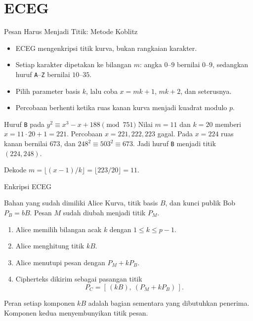 \documentclass[aspectratio=169,11pt]{beamer}
\begin{document}
\section{ECEG}

\begin{frame}{Pesan Harus Menjadi Titik: Metode Koblitz}
    \begin{itemize}
        \item ECEG mengenkripsi titik kurva, bukan rangkaian karakter.
        \item Setiap karakter dipetakan ke bilangan $m$: angka $0$--$9$
              bernilai $0$--$9$, sedangkan huruf \texttt{A}--\texttt{Z}
              bernilai $10$--$35$.
        \item Pilih parameter basis $k$, lalu coba $x = mk+1$, $mk+2$, dan
              seterusnya.
        \item Percobaan berhenti ketika ruas kanan kurva menjadi kuadrat
              modulo $p$.
    \end{itemize}
    \begin{exampleblock}{Huruf \texttt{B} pada $y^2 \equiv x^3 - x + 188
        \pmod{751}$}
        \footnotesize
        Nilai $m=11$ dan $k=20$ memberi $x = 11 \cdot 20 + 1 = 221$.
        Percobaan $x=221,222,223$ gagal. Pada $x=224$ ruas kanan bernilai
        $673$, dan $248^2 \equiv 503^2 \equiv 673$. Jadi huruf \texttt{B}
        menjadi titik $(224,248)$.
    \end{exampleblock}
    \begin{alertblock}{Dekode}
        \footnotesize
        $m = \lfloor (x-1)/k \rfloor = \lfloor 223/20 \rfloor = 11$.
    \end{alertblock}
\end{frame}

\begin{frame}{Enkripsi ECEG}
    \begin{block}{Bahan yang sudah dimiliki Alice}
        \footnotesize
        Kurva, titik basis $B$, dan kunci publik Bob
        $P_B = bB$. Pesan $M$ sudah diubah menjadi titik $P_M$.
    \end{block}
    \vspace{0.1cm}
    \begin{enumerate}
        \item Alice memilih bilangan acak $k$ dengan $1 \le k \le p-1$.
        \item Alice menghitung titik $kB$.
        \item Alice menutupi pesan dengan $P_M + kP_B$.
        \item Cipherteks dikirim sebagai pasangan titik
              \[
                  P_C = \left[\, (kB),\ (P_M + kP_B) \,\right] .
              \]
    \end{enumerate}
    \begin{alertblock}{Peran setiap komponen}
        \footnotesize
        $kB$ adalah bagian sementara yang dibutuhkan penerima. Komponen kedua
        menyembunyikan titik pesan.
    \end{alertblock}
\end{frame}
\end{document}
